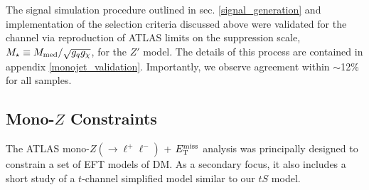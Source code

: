 The signal simulation procedure outlined in sec. \ref{signal_generation} and implementation of the selection criteria discussed above were validated for the \monojet channel via reproduction of ATLAS limits on the suppression scale, $M_{\star} \equiv M_{\mathrm{med}} / \sqrt{g_q g_{\chi}}$, for the $Z'$ model. The details of this process are contained in appendix \ref{monojet_validation}. Importantly, we observe agreement within $\sim$12\% for all samples.



\subsection{Mono-$Z$ Constraints}
\label{monoZ_constraints}
The ATLAS mono-$Z(\rightarrow \ell^+ \ell^-)$ + $E_{\mathrm{T}}^{\mathrm{miss}}$ analysis \cite{Aad:2014monoZlep} was principally designed to constrain a set of EFT models of DM. As a secondary focus, it also includes a short study of a $t$-channel simplified model similar to our $tS$ model.

